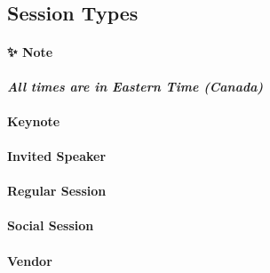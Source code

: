 \documentclass[
]{book}
\begin{document}
\hypertarget{session-types-4}{%
\subsection*{Session Types}\label{session-types-4}}

\begin{protip}
\hypertarget{note}{%
\paragraph*{✨ Note}\label{note}}

\textbf{\emph{All times are in Eastern Time (Canada)}}
\end{protip}

\begin{keynote}
\hypertarget{keynote}{%
\paragraph{Keynote}\label{keynote}}
\end{keynote}

\begin{speaker}
\hypertarget{invited-speaker}{%
\paragraph{Invited Speaker}\label{invited-speaker}}
\end{speaker}

\begin{session}
\hypertarget{regular-session}{%
\paragraph{Regular Session}\label{regular-session}}
\end{session}

\begin{social}
\hypertarget{social-session}{%
\paragraph{Social Session}\label{social-session}}
\end{social}

\begin{vendor}
\hypertarget{vendor}{%
\paragraph{Vendor}\label{vendor}}
\end{vendor}
\end{document}
